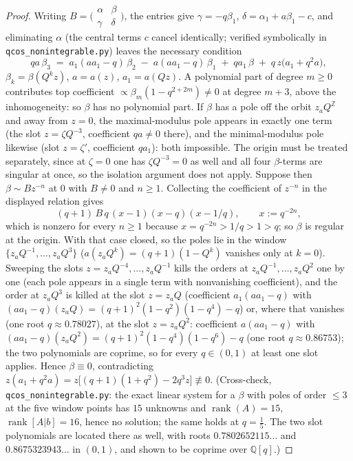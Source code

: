\documentclass[11pt]{article}
\theoremstyle{plain}
\theoremstyle{definition}
\theoremstyle{remark}
\newcommand{\Z}{\mathbb{Z}}
\newcommand{\Q}{\mathbb{Q}}
\begin{document}
\begin{proof}
Writing $B=\bigl(\begin{smallmatrix}\alpha&\beta\\\gamma&\delta\end{smallmatrix}\bigr)$, the entries give
$\gamma=-q\beta_1$, $\delta=\alpha_1+a\beta_1-c$, and eliminating $\alpha$ (the central terms $c$
cancel identically; verified symbolically in \texttt{qcos\_nonintegrable.py}) leaves the
necessary condition
\[
   qa\,\beta_3\;=\;a_1(aa_1-q)\,\beta_2\;-\;a(aa_1-q)\,\beta_1\;+\;qa_1\,\beta\;+\;q\,z\bigl(a_1+q^2a\bigr),
\]
$\beta_k=\beta(Q^kz)$, $a=a(z)$, $a_1=a(Qz)$. A polynomial part of degree $m\ge0$ contributes top
coefficient $\propto\beta_m(1-q^{2+2m})\ne0$ at degree $m+3$, above the inhomogeneity: so $\beta$
has no polynomial part. If $\beta$ has a pole off the orbit $z_aQ^{\Z}$ and away from $z=0$, the maximal-modulus pole
appears in exactly one term (the slot $z=\zeta Q^{-3}$, coefficient $qa\ne0$ there), and the
minimal-modulus pole likewise (slot $z=\zeta'$, coefficient $qa_1$): both impossible. The origin
must be treated separately, since at $\zeta=0$ one has $\zeta Q^{-3}=0$ as well and all four
$\beta$-terms are singular at once, so the isolation argument does not apply. Suppose then
$\beta\sim Bz^{-n}$ at $0$ with $B\ne0$ and $n\ge1$. Collecting the coefficient of $z^{-n}$ in the
displayed relation gives
\[
   (q+1)\,B\,q\,(x-1)(x-q)(x-1/q),\qquad x:=q^{-2n},
\]
which is nonzero for every $n\ge1$ because $x=q^{-2n}>1/q>1>q$; so $\beta$ is regular at the origin.
With that case closed, so the poles
lie in the window $\{z_aQ^{-1},\dots,z_aQ^{3}\}$ ($a(z_aQ^k)=(q+1)(1-Q^k)$ vanishes only at $k=0$).
Sweeping the slots $z=z_aQ^{-4},\dots,z_aQ^{-1}$ kills the orders at $z_aQ^{-1},\dots,z_aQ^{2}$ one
by one (each pole appears in a single term with nonvanishing coefficient), and the order at
$z_aQ^{3}$ is killed at the slot $z=z_aQ$ (coefficient $a_1(aa_1-q)$ with
$(aa_1-q)(z_aQ)=(q+1)^2(1-q^2)(1-q^4)-q$) or, where that vanishes (one root
$q\approx0.78027$), at the slot $z=z_aQ^{2}$: coefficient $a(aa_1-q)$ with
$(aa_1-q)(z_aQ^2)=(q+1)^2(1-q^4)(1-q^6)-q$ (one root $q\approx0.86753$); the two polynomials are
coprime, so for every $q\in(0,1)$ at least one slot applies. Hence $\beta\equiv0$, contradicting
$z(a_1+q^2a)=z\bigl[(q+1)(1+q^2)-2q^3z\bigr]\not\equiv0$. (Cross-check, \texttt{qcos\_nonintegrable.py}: the exact linear
system for a $\beta$ with poles of order $\le3$ at the five window points has $15$ unknowns and
$\operatorname{rank}(A)=15$, $\operatorname{rank}[A|b]=16$, hence no solution; the same holds at
$q=\tfrac15$. The two slot polynomials are located there as well, with roots
$0.7802652115\ldots$ and $0.8675323943\ldots$ in $(0,1)$, and shown to be coprime over $\Q[q]$.)
\end{proof}
\end{document}
